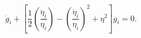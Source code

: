 \begin{equation}
\ddot{g}_{i}+\left[ \frac{1}{2}\left( \frac{\ddot{\eta}_{i}}{\eta _{i}}%
\right) -\left( \frac{\dot{\eta}_{i}}{\eta _{i}}\right) ^{2}+\eta
^{2}\right] g_{i}=0.
\end{equation}

